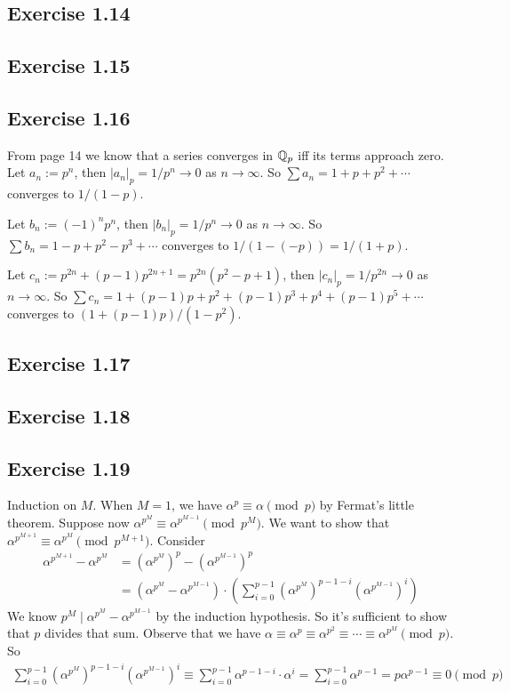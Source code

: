 \documentclass[../Koblitz.tex]{subfiles}
\begin{document}
\subsection*{Exercise 1.14}

\subsection*{Exercise 1.15}

\subsection*{Exercise 1.16}

From page 14 we know that a series converges in $\mathbb{Q}_p$ iff its terms approach zero. Let $a_n:=p^n$, then $|a_n|_p=1/p^n\to0$ as $n\to\infty$. So $\sum a_n=1+p+p^2+\cdots$ converges to $1/(1-p)$.

Let $b_n:=(-1)^np^n$, then $|b_n|_p=1/p^n\to0$ as $n\to\infty$. So $\sum b_n=1-p+p^2-p^3+\cdots$ converges to $1/(1-(-p))=1/(1+p)$.

Let $c_n:=p^{2n}+(p-1)p^{2n+1}=p^{2n}(p^2-p+1)$, then $|c_n|_p=1/p^{2n}\to0$ as $n\to\infty$. So $\sum c_n=1+(p-1)p+p^2+(p-1)p^3+p^4+(p-1)p^5+\cdots$ converges to $(1+(p-1)p)/(1-p^2)$.

\subsection*{Exercise 1.17}

\subsection*{Exercise 1.18}

\subsection*{Exercise 1.19}

Induction on $M$. When $M=1$, we have $\alpha^p\equiv\alpha\pmod{p}$ by Fermat's little theorem. Suppose now $\alpha^{p^M}\equiv\alpha^{p^{M-1}} \pmod{p^M}$. We want to show that $\alpha^{p^{M+1}}\equiv\alpha^{p^M} \pmod{p^{M+1}}$. Consider
\begin{align*}
\alpha^{p^{M+1}}-\alpha^{p^M} &= \left(\alpha^{p^M}\right)^p - \left(\alpha^{p^{M-1}}\right)^p \\
&= \left(\alpha^{p^M}-\alpha^{p^{M-1}}\right)\cdot \left(\sum_{i=0}^{p-1} \left(\alpha^{p^M}\right)^{p-1-i}\left(\alpha^{p^{M-1}}\right)^i\right)
\end{align*}
We know $p^M\mid\alpha^{p^M}-\alpha^{p^{M-1}}$ by the induction hypothesis. So it's sufficient to show that $p$ divides that sum. Observe that we have $\alpha\equiv\alpha^p\equiv\alpha^{p^2}\equiv\cdots\equiv\alpha^{p^M} \pmod{p}$. So
\begin{align*}
\sum_{i=0}^{p-1} \left(\alpha^{p^M}\right)^{p-1-i}\left(\alpha^{p^{M-1}}\right)^i \equiv \sum_{i=0}^{p-1} \alpha^{p-1-i}\cdot\alpha^i = \sum_{i=0}^{p-1} \alpha^{p-1} = p\alpha^{p-1} \equiv 0 \pmod{p}
\end{align*}
\end{document}
